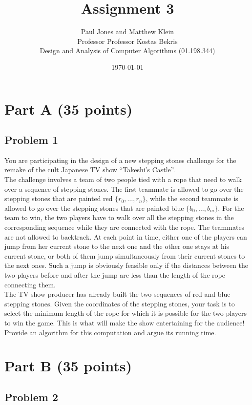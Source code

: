 \documentclass[11pt]{article}
\title{Assignment 3}
\author{Paul Jones and Matthew Klein \\
		Professor Professor Kostas Bekris\\
		Design and Analysis of Computer Algorithms (01.198.344)}
\date{\today}
\begin{document}
\pagebreak

\section*{Part A (35 points)}

\subsection*{Problem 1} You are participating in the design of a
new stepping stones challenge for the remake of the cult Japanese TV
show ``Takeshi's Castle''.\\

\noindent The challenge involves a team of two people tied with a rope
that need to walk over a sequence of stepping stones. The first
teammate is allowed to go over the stepping stones that are painted
red $\{r_0, \ldots, r_n\}$, while the second teammate is allowed to go
over the stepping stones that are painted blue $\{b_0, \ldots,
b_m\}$. For the team to win, the two players have to walk over all the
stepping stones in the corresponding sequence while they are connected
with the rope. The teammates are not allowed to backtrack. At each
point in time, either one of the players can jump from her current
stone to the next one and the other one stays at his current stone, or
both of them jump simultaneously from their current stones to the next
ones. Such a jump is obviously feasible only if the distances between
the two players before and after the jump are less than the length of
the rope connecting them.\\

\noindent The TV show producer has already built the two sequences of
red and blue stepping stones. Given the coordinates of the stepping
stones, your task is to select the minimum length of the rope for
which it is possible for the two players to win the game. This is what
will make the show entertaining for the audience!\\

\noindent Provide an algorithm for this computation and argue its
running time.


\section*{Part B (35 points)}

\subsection*{Problem 2}
\end{document}
